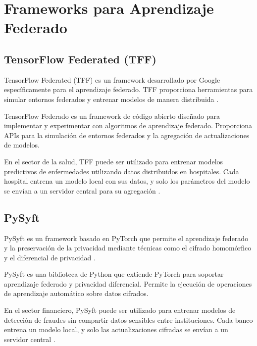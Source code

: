 \section{Frameworks para Aprendizaje Federado}
\label{chap:4}

\subsection{TensorFlow Federated (TFF)}
TensorFlow Federated (TFF) es un framework desarrollado por Google específicamente para el aprendizaje federado. TFF proporciona herramientas para simular entornos federados y entrenar modelos de manera distribuida \cite{bonawitz2019towards}.

\begin{definition}
	TensorFlow Federado es un framework de código abierto diseñado para implementar y experimentar con algoritmos de aprendizaje federado. Proporciona APIs para la simulación de entornos federados y la agregación de actualizaciones de modelos.
\end{definition}

\begin{example}
	En el sector de la salud, TFF puede ser utilizado para entrenar modelos predictivos de enfermedades utilizando datos distribuidos en hospitales. Cada hospital entrena un modelo local con sus datos, y solo los parámetros del modelo se envían a un servidor central para su agregación \cite{mcmahan2017communication}.
\end{example}

\subsection{PySyft}
PySyft es un framework basado en PyTorch que permite el aprendizaje federado y la preservación de la privacidad mediante técnicas como el cifrado homomórfico y el diferencial de privacidad \cite{ryffel2018generic}.

\begin{definition}[PySyft]
	PySyft es una biblioteca de Python que extiende PyTorch para soportar aprendizaje federado y privacidad diferencial. Permite la ejecución de operaciones de aprendizaje automático sobre datos cifrados.
\end{definition}

\begin{example}
	En el sector financiero, PySyft puede ser utilizado para entrenar modelos de detección de fraudes sin compartir datos sensibles entre instituciones. Cada banco entrena un modelo local, y solo las actualizaciones cifradas se envían a un servidor central \cite{dwork2014algorithmic}.
\end{example}

